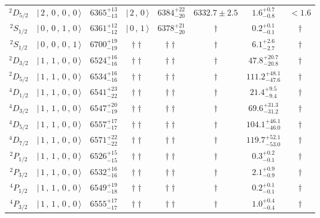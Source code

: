 \begin{tabular}{c| c c c c c c c}
$^{2}D_{5/2}$ & $\vert \,2\,,\,0\,,\,0\,,\,0 \,\rangle $ & $6365^{+13}_{-13}$ & $\vert \,2\,,\,0 \,\rangle$ & $6384^{+22}_{-20}$ & $6332.7\pm 2.5$ & $1.6^{+0.7}_{-0.8}$ & $<1.6$ \\ 
$^{2}S_{1/2}$ & $\vert \,0\,,\,0\,,\,1\,,\,0 \,\rangle $ & $6361^{+12}_{-12}$ & $\vert \,0\,,\,1 \,\rangle$ & $6378^{+21}_{-20}$ & $\dagger$ & $0.2^{+0.1}_{-0.1}$ & $\dagger$ \\ 
$^{2}S_{1/2}$ & $\vert \,0\,,\,0\,,\,0\,,\,1 \,\rangle $ & $6700^{+19}_{-19}$ & $\dagger\dagger$ & $\dagger\dagger$ & $\dagger$ & $6.1^{+2.6}_{-2.7}$ & $\dagger$ \\ 
$^{2}D_{3/2}$ & $\vert \,1\,,\,1\,,\,0\,,\,0 \,\rangle $ & $6524^{+16}_{-16}$ & $\dagger\dagger$ & $\dagger\dagger$ & $\dagger$ & $47.8^{+20.7}_{-20.8}$ & $\dagger$ \\ 
$^{2}D_{5/2}$ & $\vert \,1\,,\,1\,,\,0\,,\,0 \,\rangle $ & $6534^{+16}_{-16}$ & $\dagger\dagger$ & $\dagger\dagger$ & $\dagger$ & $111.2^{+48.1}_{-47.6}$ & $\dagger$ \\ 
$^{4}D_{1/2}$ & $\vert \,1\,,\,1\,,\,0\,,\,0 \,\rangle $ & $6541^{+23}_{-22}$ & $\dagger\dagger$ & $\dagger\dagger$ & $\dagger$ & $21.4^{+9.5}_{-9.4}$ & $\dagger$ \\ 
$^{4}D_{3/2}$ & $\vert \,1\,,\,1\,,\,0\,,\,0 \,\rangle $ & $6547^{+20}_{-19}$ & $\dagger\dagger$ & $\dagger\dagger$ & $\dagger$ & $69.6^{+31.3}_{-31.2}$ & $\dagger$ \\ 
$^{4}D_{5/2}$ & $\vert \,1\,,\,1\,,\,0\,,\,0 \,\rangle $ & $6557^{+17}_{-17}$ & $\dagger\dagger$ & $\dagger\dagger$ & $\dagger$ & $104.1^{+46.1}_{-46.0}$ & $\dagger$ \\ 
$^{4}D_{7/2}$ & $\vert \,1\,,\,1\,,\,0\,,\,0 \,\rangle $ & $6571^{+22}_{-22}$ & $\dagger\dagger$ & $\dagger\dagger$ & $\dagger$ & $119.7^{+52.1}_{-53.0}$ & $\dagger$ \\ 
$^{2}P_{1/2}$ & $\vert \,1\,,\,1\,,\,0\,,\,0 \,\rangle $ & $6526^{+15}_{-15}$ & $\dagger\dagger$ & $\dagger\dagger$ & $\dagger$ & $0.3^{+0.2}_{-0.1}$ & $\dagger$ \\ 
$^{2}P_{3/2}$ & $\vert \,1\,,\,1\,,\,0\,,\,0 \,\rangle $ & $6532^{+16}_{-16}$ & $\dagger\dagger$ & $\dagger\dagger$ & $\dagger$ & $2.1^{+0.9}_{-0.9}$ & $\dagger$ \\ 
$^{4}P_{1/2}$ & $\vert \,1\,,\,1\,,\,0\,,\,0 \,\rangle $ & $6549^{+19}_{-18}$ & $\dagger\dagger$ & $\dagger\dagger$ & $\dagger$ & $0.2^{+0.1}_{-0.1}$ & $\dagger$ \\ 
$^{4}P_{3/2}$ & $\vert \,1\,,\,1\,,\,0\,,\,0 \,\rangle $ & $6555^{+17}_{-17}$ & $\dagger\dagger$ & $\dagger\dagger$ & $\dagger$ & $1.0^{+0.4}_{-0.4}$ & $\dagger$ \\ 

\end{tabular}

